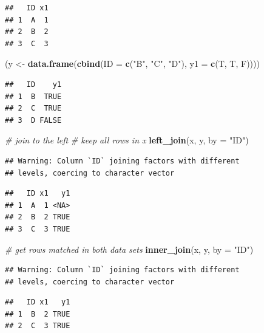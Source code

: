 \documentclass[12pt,]{krantz}
\makeatletter
\newenvironment{Shaded}{\begin{snugshade}}{\end{snugshade}}
\newcommand{\CommentTok}[1]{\textcolor[rgb]{0.37,0.37,0.37}{\textit{#1}}}
\newcommand{\DataTypeTok}[1]{\textcolor[rgb]{0.27,0.27,0.27}{#1}}
\newcommand{\KeywordTok}[1]{\textcolor[rgb]{0.27,0.27,0.27}{\textbf{#1}}}
\newcommand{\NormalTok}[1]{#1}
\newcommand{\StringTok}[1]{\textcolor[rgb]{0.5,0.5,0.5}{#1}}
\newenvironment{kframe}{%
\medskip{}
\setlength{\fboxsep}{.8em}
 \def\at@end@of@kframe{}%
 \ifinner\ifhmode%
  \def\at@end@of@kframe{\end{minipage}}%
  \begin{minipage}{\columnwidth}%
 \fi\fi%
 \def\FrameCommand##1{\hskip\@totalleftmargin \hskip-\fboxsep
 \colorbox{shadecolor}{##1}\hskip-\fboxsep
     \hskip-\linewidth \hskip-\@totalleftmargin \hskip\columnwidth}%
 \MakeFramed {\advance\hsize-\width
   \@totalleftmargin\z@ \linewidth\hsize
   \@setminipage}}%
 {\par\unskip\endMakeFramed%
 \at@end@of@kframe}
\renewenvironment{Shaded}{\begin{kframe}}{\end{kframe}}
\makeatother
\begin{document}
\begin{verbatim}
##   ID x1
## 1  A  1
## 2  B  2
## 3  C  3
\end{verbatim}

\begin{Shaded}
\begin{Highlighting}[]
\NormalTok{(y <-}\StringTok{ }\KeywordTok{data.frame}\NormalTok{(}\KeywordTok{cbind}\NormalTok{(}\DataTypeTok{ID =} \KeywordTok{c}\NormalTok{(}\StringTok{"B"}\NormalTok{, }\StringTok{"C"}\NormalTok{, }\StringTok{"D"}\NormalTok{), }\DataTypeTok{y1 =} \KeywordTok{c}\NormalTok{(T, T, F))))}
\end{Highlighting}
\end{Shaded}

\begin{verbatim}
##   ID    y1
## 1  B  TRUE
## 2  C  TRUE
## 3  D FALSE
\end{verbatim}

\begin{Shaded}
\begin{Highlighting}[]
\CommentTok{# join to the left}
\CommentTok{# keep all rows in x}
\KeywordTok{left_join}\NormalTok{(x, y, }\DataTypeTok{by =} \StringTok{"ID"}\NormalTok{)}
\end{Highlighting}
\end{Shaded}

\begin{verbatim}
## Warning: Column `ID` joining factors with different
## levels, coercing to character vector
\end{verbatim}

\begin{verbatim}
##   ID x1   y1
## 1  A  1 <NA>
## 2  B  2 TRUE
## 3  C  3 TRUE
\end{verbatim}

\begin{Shaded}
\begin{Highlighting}[]
\CommentTok{# get rows matched in both data sets}
\KeywordTok{inner_join}\NormalTok{(x, y, }\DataTypeTok{by =} \StringTok{"ID"}\NormalTok{)}
\end{Highlighting}
\end{Shaded}

\begin{verbatim}
## Warning: Column `ID` joining factors with different
## levels, coercing to character vector
\end{verbatim}

\begin{verbatim}
##   ID x1   y1
## 1  B  2 TRUE
## 2  C  3 TRUE
\end{verbatim}
\end{document}
